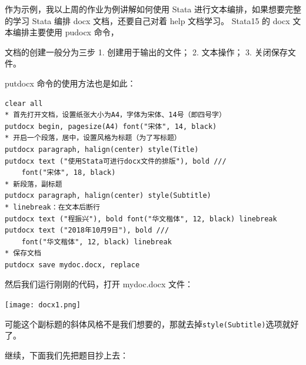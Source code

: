 \documentclass[cn,fancy,blue,11pt]{elegantbook}
\begin{document}
作为示例，我以上周的作业为例讲解如何使用 Stata 进行文本编排，如果想要完整的学习 Stata 编排 docx 文档，还要自己对着 help 文档学习。
Stata15 的 docx 文本编排主要使用 pudocx 命令，

文档的创建一般分为三步
1. 创建用于输出的文件；
2. 文本操作；
3. 关闭保存文件。

putdocx 命令的使用方法也是如此：

\begin{lstlisting}
clear all
* 首先打开文档，设置纸张大小为A4，字体为宋体、14号（即四号字）
putdocx begin, pagesize(A4) font("宋体", 14, black)
* 开启一个段落，居中，设置风格为标题（为了写标题）
putdocx paragraph, halign(center) style(Title)
putdocx text ("使用Stata可进行docx文件的排版"), bold ///
    font("宋体", 18, black)
* 新段落，副标题
putdocx paragraph, halign(center) style(Subtitle)
* linebreak：在文本后断行
putdocx text ("程振兴"), bold font("华文楷体", 12, black) linebreak
putdocx text ("2018年10月9日"), bold ///
    font("华文楷体", 12, black) linebreak
* 保存文档
putdocx save mydoc.docx, replace
\end{lstlisting}

然后我们运行刚刚的代码，打开 mydoc.docx 文件：

\noindent\texttt{[image: docx1.png]}

可能这个副标题的斜体风格不是我们想要的，那就去掉\lstinline{style(Subtitle)}选项就好了。

继续，下面我们先把题目抄上去：
\end{document}
